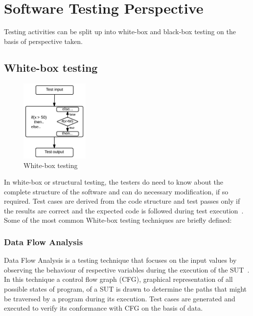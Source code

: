 \section{Software Testing Perspective}
Testing activities can be split up into white-box and black-box testing on the basis of perspective taken. 

\subsection{White-box testing}
\begin{figure}
  \vspace{-38pt}
  \begin{center}
    \includegraphics[width=0.30\textwidth]{chapter2/whiteBox.png}
  \end{center}
  \vspace{-20pt}
  \caption{White-box testing}
  \label{fig:whiteBox}
  \vspace{-20pt}
\end{figure}
In white-box or structural testing, the testers do need to know about the complete structure of the software and can do necessary modification, if so required. Test cases are derived from the code structure and test passes only if the results are correct and the expected code is followed during test execution~\cite{ostrand2002white}. Some of the most common White-box testing techniques are briefly defined:

\subsubsection{Data Flow Analysis}
Data Flow Analysis is a testing technique that focuses on the input values by observing the behaviour of respective variables during the execution of the SUT~\cite{clarke1989formal}. In this technique a control flow graph (CFG), graphical representation of all possible states of program, of a SUT is drawn to determine the paths that might be traversed by a program during its execution. Test cases are generated and executed to verify its conformance with CFG on the basis of data. 

